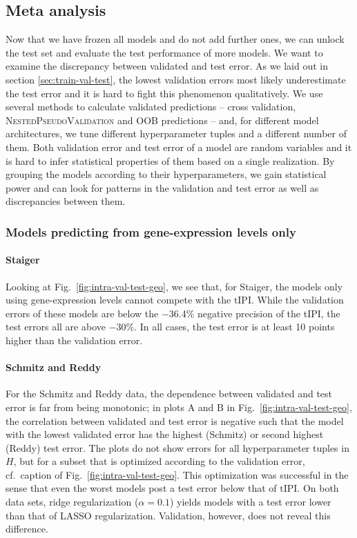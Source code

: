 \subsection{Meta analysis}\label{subsec:results-intra-meta}

Now that we have frozen all models and do not add further ones, we can unlock the test set and 
evaluate the test performance of more models. We want to examine the discrepancy between 
validated and test error. As we laid out in section \ref{sec:train-val-test}, the lowest validation 
errors most likely underestimate the test error and it is hard to fight this 
phenomenon qualitatively. We use several methods to calculate validated predictions -- cross 
validation, \textsc{NestedPseudoValidation} and OOB predictions -- and, for different model 
architectures, we tune different hyperparameter tuples and a different 
number of them. Both validation error and test error of a model are random 
variables and it is hard to infer statistical properties of them based on a single realization. 
By grouping the models according to their hyperparameters, we gain 
statistical power and can look for patterns in the validation and test error as well as 
discrepancies between them.

\subsubsection{Models predicting from gene-expression levels only}



\paragraph{Staiger}
Looking at Fig.\ \ref{fig:intra-val-test-geo}, we see that, for Staiger, the models only using 
gene-expression levels cannot compete with the $\text{tIPI}$. While the validation errors of these 
models are 
below the \num{-36.4}\% negative precision of the tIPI, the test errors all are above \num{-30}\%. 
In all cases, the test error is at least 10 points higher than the validation error.  

\paragraph{Schmitz and Reddy}
For the Schmitz and Reddy data, the dependence between validated and test error is far from 
being monotonic; in plots A and B in Fig.\ \ref{fig:intra-val-test-geo}, the
correlation between validated and test 
error is negative such that the model with the lowest validated error has the highest 
(Schmitz) or second highest (Reddy) test error. The plots do not show errors for all 
hyperparameter tuples in $H$, but for a subset that is optimized according to the validation error, 
cf.\ caption of Fig.\ \ref{fig:intra-val-test-geo}. This optimization was successful in the sense 
that even the worst models post a test error below that of $\text{tIPI}$.
On both data sets, ridge 
regularization ($\alpha = \num{0.1}$) yields models with a test error lower than that of LASSO 
regularization. Validation, however, does not reveal this difference. 

